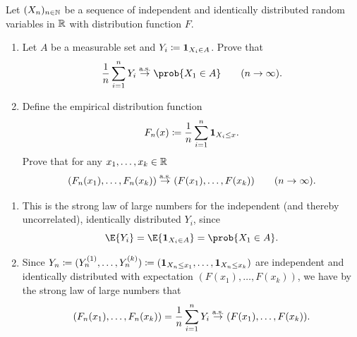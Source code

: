 
\begin{exercise}[subtitle={Mean of indicators \Coffeecup}]
    \label{ex: mean of indicators}
    Let \((X_n)_{n\in \mathbb{N}}\) be a sequence of independent and identically
    distributed random variables in \(\mathbb{R}\) with distribution function \(F\).
    \begin{enumerate}[label=(\alph*),noitemsep]
        \item\label{it: (mean of indicators) a}
        Let \(A\) be a measurable set and \(Y_i \coloneq \ind{X_i \in A}\).
        Prove that
        \[
            \frac1n \sum_{i=1}^n Y_i \overset{\as}\to \prob{X_1 \in A}
            \qquad (n \to \infty).
        \]

        \item\label{it: (mean of indicators) b}
        Define the empirical distribution function
        \[
            F_n(x) \coloneq \frac1n \sum_{i=1}^n \ind{X_i \le x}.
        \]
        Prove that for any \(x_1, \dots, x_k \in \mathbb{R}\)
        \[
            (F_n(x_1), \dots, F_n(x_k)) \overset{\operatorname{\text{a.s.}}}\to (F(x_1), \dots, F(x_k))
            \qquad (n \to \infty).
        \]
    \end{enumerate}
\end{exercise}
\begin{solution}
\begin{enumerate}[wide=0pt]
    \item[\ref{it: (mean of indicators) a}]
    This is the strong law of large numbers for the independent (and
    thereby uncorrelated), identically distributed \(Y_i\), since
    \[
        \E{Y_i} = \E{\ind{X_i \in A}} = \prob{X_1 \in A}.
    \]

    \item[\ref{it: (mean of indicators) b}]
    Since \(Y_n\coloneq (Y_n^{(1)}, \dots, Y_n^{(k)}) \coloneq (\ind{X_n
    \le x_1}, \dots, \ind{X_n \le x_k})\) are independent and
    identically distributed with expectation \((F(x_1), \dots,
    F(x_k))\), we have by the strong law of large numbers that
    \[
        (F_n(x_1), \dots, F_n(x_k)) = \frac1n \sum_{i=1}^n Y_i
        \overset{\operatorname{\text{a.s.}}}\to (F(x_1), \dots, F(x_k)).
    \]
\end{enumerate} 
\end{solution}
